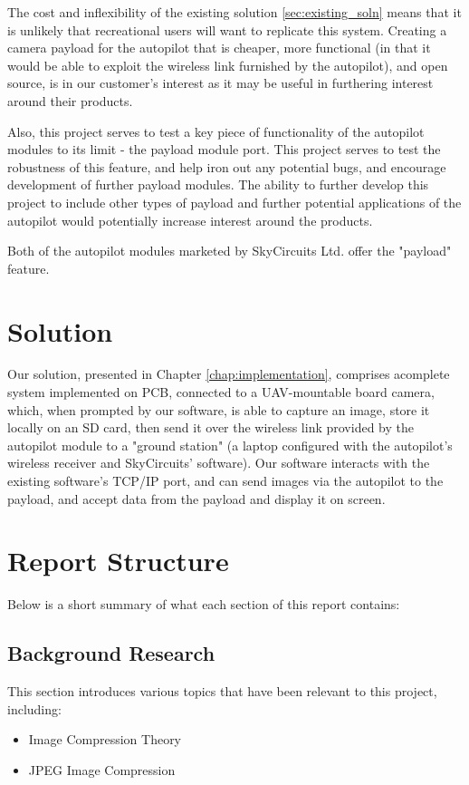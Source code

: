 The cost and inflexibility of the existing solution \ref{sec:existing_soln} means that it is unlikely that recreational users will want to replicate this system. Creating a camera payload for the autopilot that is cheaper, more functional (in that it would be able to exploit the wireless link furnished by the autopilot), and open source, is in our customer's interest as it may be useful in furthering interest around their products.

Also, this project serves to test a key piece of functionality of the autopilot modules to its limit - the payload module port. This project serves to test the robustness of this feature, and help iron out any potential bugs, and encourage development of further payload modules. The ability to further develop this project to include other types of payload and further potential applications of the autopilot would potentially increase interest around the products.

Both of the autopilot modules marketed by SkyCircuits Ltd. offer the "payload" feature.

\section{Solution}

Our solution, presented in Chapter \ref{chap:implementation}, comprises acomplete system implemented on PCB, connected to a UAV-mountable board camera, which, when prompted by our software, is able to capture an image, store it locally on an SD card, then send it over the wireless link provided by the autopilot module to a "ground station" (a laptop configured with the autopilot's wireless receiver and SkyCircuits' software). Our software interacts with the existing software's TCP/IP port, and can send images via the autopilot to the payload, and accept data from the payload and display it on screen.

\section{Report Structure}

Below is a short summary of what each section of this report contains:

\subsection{Background Research}
This section introduces various topics that have been relevant to this project, including:
\begin{itemize}
\item Image Compression Theory
\item JPEG Image Compression 
\end{itemize}

